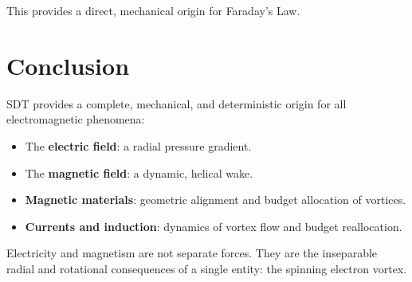 This provides a direct, mechanical origin for Faraday's Law.


\section{Conclusion}

SDT provides a complete, mechanical, and deterministic origin for all electromagnetic phenomena:
\begin{itemize}
  \item The \textbf{electric field}: a radial pressure gradient.
  \item The \textbf{magnetic field}: a dynamic, helical wake.
  \item \textbf{Magnetic materials}: geometric alignment and budget allocation of vortices.
  \item \textbf{Currents and induction}: dynamics of vortex flow and budget reallocation.
\end{itemize}

Electricity and magnetism are not separate forces.  They are the inseparable radial and rotational consequences of a single entity: the spinning electron vortex.
